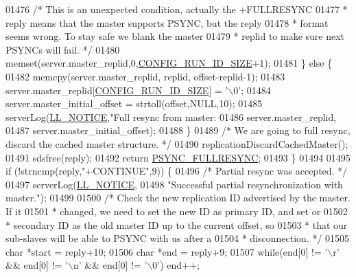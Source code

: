 \begin{DoxyCode}
{{{{{{{{{{{{{{{{{{{{{{{{{{{{{{{{{{{{{{{{{{{{{{{{{{{{{01476             \textcolor{comment}{/* This is an unexpected condition, actually the +FULLRESYNC}
01477 \textcolor{comment}{             * reply means that the master supports PSYNC, but the reply}
01478 \textcolor{comment}{             * format seems wrong. To stay safe we blank the master}
01479 \textcolor{comment}{             * replid to make sure next PSYNCs will fail. */}
01480             memset(server.master\_replid,0,\hyperlink{server_8h_aba6794fa3ee28f85165eaed93190f1df}{CONFIG\_RUN\_ID\_SIZE}+1);
01481         \} \textcolor{keywordflow}{else} \{
01482             memcpy(server.master\_replid, replid, offset-replid-1);
01483             server.master\_replid[\hyperlink{server_8h_aba6794fa3ee28f85165eaed93190f1df}{CONFIG\_RUN\_ID\_SIZE}] = \textcolor{stringliteral}{'\(\backslash\)0'};
01484             server.master\_initial\_offset = strtoll(offset,NULL,10);
01485             serverLog(\hyperlink{server_8h_a8c54c191e436c7dd3012167212692401}{LL\_NOTICE},\textcolor{stringliteral}{"Full resync from master: %
01486                 server.master\_replid,
01487                 server.master\_initial\_offset);
01488         \}
01489         \textcolor{comment}{/* We are going to full resync, discard the cached master structure. */}
01490         replicationDiscardCachedMaster();
01491         sdsfree(reply);
01492         \textcolor{keywordflow}{return} \hyperlink{replication_8c_a9d0b6b76f92efdd69eba7de13dae3764}{PSYNC\_FULLRESYNC};
01493     \}
01494 
01495     \textcolor{keywordflow}{if} (!strncmp(reply,\textcolor{stringliteral}{"+CONTINUE"},9)) \{
01496         \textcolor{comment}{/* Partial resync was accepted. */}
01497         serverLog(\hyperlink{server_8h_a8c54c191e436c7dd3012167212692401}{LL\_NOTICE},
01498             \textcolor{stringliteral}{"Successful partial resynchronization with master."});
01499 
01500         \textcolor{comment}{/* Check the new replication ID advertised by the master. If it}
01501 \textcolor{comment}{         * changed, we need to set the new ID as primary ID, and set or}
01502 \textcolor{comment}{         * secondary ID as the old master ID up to the current offset, so}
01503 \textcolor{comment}{         * that our sub-slaves will be able to PSYNC with us after a}
01504 \textcolor{comment}{         * disconnection. */}
01505         \textcolor{keywordtype}{char} *start = reply+10;
01506         \textcolor{keywordtype}{char} *end = reply+9;
01507         \textcolor{keywordflow}{while}(end[0] != \textcolor{stringliteral}{'\(\backslash\)r'} && end[0] != \textcolor{stringliteral}{'\(\backslash\)n'} && end[0] != \textcolor{stringliteral}{'\(\backslash\)0'}) end++;
}}}}}}}}}}}}}}}}}}}}}}}}}}}}}}}}}}}}}}}}}}}}}}}}}}}}}}
\end{DoxyCode}
